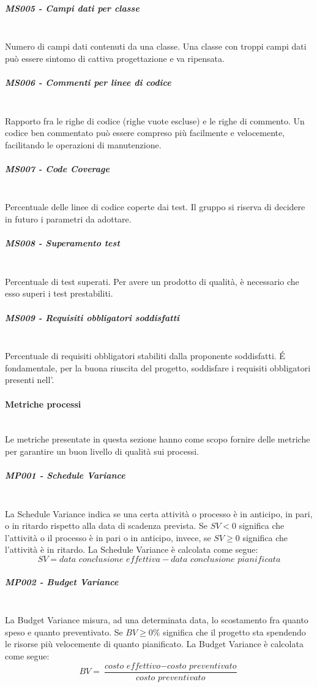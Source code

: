 \subparagraph{MS005 - Campi dati per classe}\mbox{}\\
Numero di campi dati contenuti da una classe. Una classe con troppi campi dati può essere sintomo di cattiva progettazione e va ripensata.
\subparagraph{MS006 - Commenti per linee di codice}\mbox{}\\
Rapporto fra le righe di codice (righe vuote escluse) e le righe di commento. Un codice ben commentato può essere compreso più facilmente e velocemente, facilitando le operazioni di manutenzione.
\subparagraph{MS007 - Code Coverage}\mbox{}\\
Percentuale delle linee di codice coperte dai test.
Il gruppo \gruppo \space si riserva di decidere in futuro i parametri da adottare.
\subparagraph{MS008 - Superamento test}\mbox{}\\
Percentuale di test superati. Per avere un prodotto di qualità, è necessario che esso superi i test prestabiliti.
\subparagraph{MS009 - Requisiti obbligatori soddisfatti}\mbox{}\\
Percentuale di requisiti obbligatori stabiliti dalla proponente soddisfatti. \'E fondamentale, per la buona riuscita del progetto, soddisfare i requisiti obbligatori presenti nell'\AdR .
	
\paragraph{Metriche processi}\mbox{}\\
Le metriche presentate in questa sezione hanno come scopo fornire delle metriche per garantire un buon livello di qualità sui processi.
\subparagraph{MP001 - Schedule Variance}\mbox{}\\
La Schedule Variance indica se una certa attività o processo è in anticipo, in pari, o in ritardo rispetto alla data di scadenza prevista.
Se $SV < 0$ significa che l'attività o il processo è in pari o in anticipo, invece, se $SV \geq 0$ significa che l'attività è in ritardo.
La Schedule Variance è calcolata come segue:
\[
SV = \textit{data conclusione effettiva} - \textit{data conclusione pianificata}
\]
\subparagraph{MP002 - Budget Variance}\mbox{}\\
La Budget Variance misura, ad una determinata data, lo scostamento fra quanto speso e quanto preventivato. Se $BV \geq 0\%$ significa che il progetto sta spendendo le risorse più velocemente di quanto pianificato.
La Budget Variance è calcolata come segue:
\[
BV = \frac{\textit{costo effettivo} - \textit{costo preventivato}}{\textit{costo preventivato}}
\]


